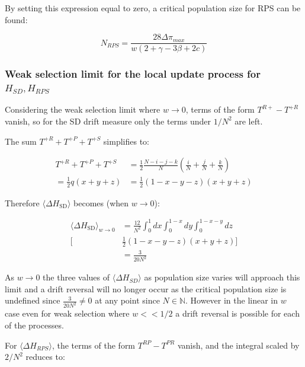 \documentclass[./main.tex]{subfiles}
\begin{document}
By setting this expression equal to zero, a critical population size for RPS can be found:

\begin{equation}
N_{RPS} = \frac{28 \Delta \pi_{max}}{w(2 + \gamma - 3 \beta + 2c)}
\end{equation}









\subsubsection{Weak selection limit for the local update process for $H_{SD}, H_{RPS}$}
Considering the weak selection limit where $w \rightarrow 0$, terms of the form 
$T^{R+} - T^{+R}$ vanish, so for the SD drift measure only the terms under $1/N^2$ are left.

The sum $T^{+R} + T^{+P} + T^{+S}$ simplifies to:

\begin{align}
T^{+R} + T^{+P} + T^{+S} &= \frac{1}{2}\frac{N-i-j-k}{N}\left(\frac{i}{N} + \frac{j}{N} + \frac{k}{N}\right) \nonumber \\
= \frac{1}{2}q(x+y+z) &= \frac{1}{2}(1-x-y-z)(x+y+z) \nonumber 
\end{align}

Therefore $\langle \Delta H_{\mathrm{SD}} \rangle$ becomes (when $w \rightarrow 0$):

\begin{align}\label{eq:delta_h_sd_weak}
\langle \Delta H_{\mathrm{SD}} \rangle_{w \rightarrow 0} 
&= \frac{12}{N^2} \int_{0}^{1} dx \int_{0}^{1-x}dy 
\int_{0}^{1-x-y} dz \nonumber \\ 
\Big[&  \frac{1}{2}(1-x-y-z)(x+y+z) \Big] \nonumber \\
&= \frac{3}{20N^2}
\end{align}


As $w \rightarrow 0$ the three values of $\langle \Delta H_{SD} \rangle$ as
population size varies will approach this limit and a drift reversal will no longer occur as the critical population size is undefined since
$\frac{3}{20N^2} \ne 0$ at any point since $N \in \mathbb{N}$. However in the linear in $w$ case even for weak selection 
where $w << 1/2$ a drift reversal is possible for each of the processes.



For $\langle \Delta H_{RPS} \rangle$, the terms of the form $T^{RP} - T^{PR}$ vanish, and the 
integral scaled by $2/N^2$ reduces to:
\end{document}
